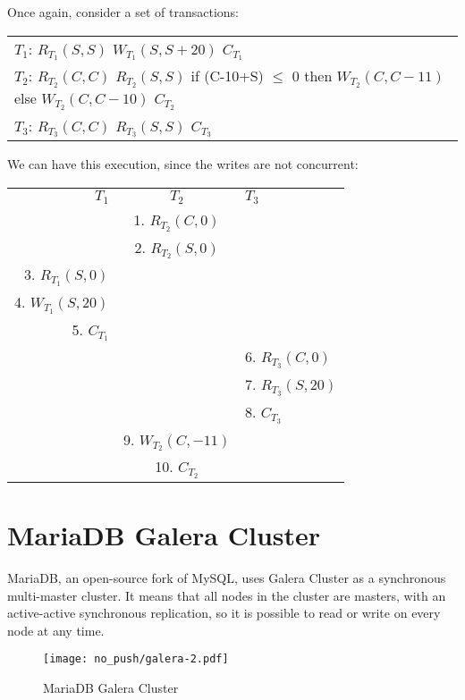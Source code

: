Once again, consider a set of transactions:
\begin{table}[H]
  \centering
  \begin{tabular}{ l }
    $T{_1}$:   $R_{T_1}(S, S)$ $W_{T_1}(S, S+20)$ $C_{T_1}$ \\
    $T{_2}$:   $R_{T_2}(C, C)$ $R_{T_2}(S, S)$ if (C-10+S) $\leq$ 0 then $W_{T_2}(C, C-11)$ else $W_{T_2}(C, C-10)$ $C_{T_2}$ \\
    $T{_3}$:   $R_{T_3}(C, C)$ $R_{T_3}(S, S)$ $C_{T_3}$ \\
  \end{tabular}
\end{table}

We can have this execution, since the writes are not concurrent:

\begin{table}[H]
  \centering
  \begin{tabular}{ r | c | l }
    $T_1$ & $T_2$ & $T_3$ \\
    & 1. $R_{T_2}(C,0)$ & \\
    & 2. $R_{T_2}(S,0)$ & \\
    3. $R_{T_1}(S,0)$ & & \\
    4. $W_{T_1}(S,20)$ & & \\
    5. $C_{T_1}$ & & \\
    & & 6. $R_{T_3}(C,0)$ \\
    & & 7. $R_{T_3}(S,20)$ \\
    & & 8. $C_{T_3}$ \\
    & 9. $W_{T_2}(C,-11)$ & \\
    & 10. $C_{T_2}$ & \\
  \end{tabular}
\end{table}

\section{MariaDB Galera Cluster}
\label{sec:galera-cluster}
MariaDB, an open-source fork of MySQL, uses Galera Cluster as a synchronous multi-master cluster. It means that all nodes in the cluster are masters, with an active-active synchronous replication, so it is possible to read or write on every node at any time.

\begin{figure}[H]
  \vspace{-10pt}
  \centering
  \centerline{\texttt{[image: no\_push/galera-2.pdf]}}
  \vspace{-5pt}
  \caption{MariaDB Galera Cluster}
  \vspace{-5pt}
  \label{fig:MGC}
\end{figure}

